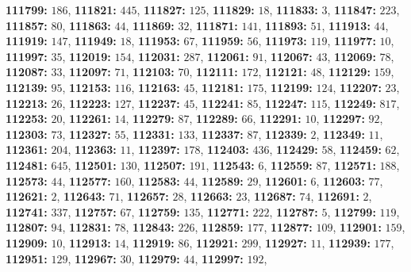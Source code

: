 \textsf{\bfseries 111799:} $186$, \textsf{\bfseries 111821:} $445$, \textsf{\bfseries 111827:} $125$, \textsf{\bfseries 111829:} $18$, \textsf{\bfseries 111833:} $3$, \textsf{\bfseries 111847:} $223$, \textsf{\bfseries 111857:} $80$, \textsf{\bfseries 111863:} $44$, \textsf{\bfseries 111869:} $32$, \textsf{\bfseries 111871:} $141$, \textsf{\bfseries 111893:} $51$, \textsf{\bfseries 111913:} $44$, \textsf{\bfseries 111919:} $147$, \textsf{\bfseries 111949:} $18$, \textsf{\bfseries 111953:} $67$, \textsf{\bfseries 111959:} $56$, \textsf{\bfseries 111973:} $119$, \textsf{\bfseries 111977:} $10$, \textsf{\bfseries 111997:} $35$, \textsf{\bfseries 112019:} $154$, \textsf{\bfseries 112031:} $287$, \textsf{\bfseries 112061:} $91$, \textsf{\bfseries 112067:} $43$, \textsf{\bfseries 112069:} $78$, \textsf{\bfseries 112087:} $33$, \textsf{\bfseries 112097:} $71$, \textsf{\bfseries 112103:} $70$, \textsf{\bfseries 112111:} $172$, \textsf{\bfseries 112121:} $48$, \textsf{\bfseries 112129:} $159$, \textsf{\bfseries 112139:} $95$, \textsf{\bfseries 112153:} $116$, \textsf{\bfseries 112163:} $45$, \textsf{\bfseries 112181:} $175$, \textsf{\bfseries 112199:} $124$, \textsf{\bfseries 112207:} $23$, \textsf{\bfseries 112213:} $26$, \textsf{\bfseries 112223:} $127$, \textsf{\bfseries 112237:} $45$, \textsf{\bfseries 112241:} $85$, \textsf{\bfseries 112247:} $115$, \textsf{\bfseries 112249:} $817$, \textsf{\bfseries 112253:} $20$, \textsf{\bfseries 112261:} $14$, \textsf{\bfseries 112279:} $87$, \textsf{\bfseries 112289:} $66$, \textsf{\bfseries 112291:} $10$, \textsf{\bfseries 112297:} $92$, \textsf{\bfseries 112303:} $73$, \textsf{\bfseries 112327:} $55$, \textsf{\bfseries 112331:} $133$, \textsf{\bfseries 112337:} $87$, \textsf{\bfseries 112339:} $2$, \textsf{\bfseries 112349:} $11$, \textsf{\bfseries 112361:} $204$, \textsf{\bfseries 112363:} $11$, \textsf{\bfseries 112397:} $178$, \textsf{\bfseries 112403:} $436$, \textsf{\bfseries 112429:} $58$, \textsf{\bfseries 112459:} $62$, \textsf{\bfseries 112481:} $645$, \textsf{\bfseries 112501:} $130$, \textsf{\bfseries 112507:} $191$, \textsf{\bfseries 112543:} $6$, \textsf{\bfseries 112559:} $87$, \textsf{\bfseries 112571:} $188$, \textsf{\bfseries 112573:} $44$, \textsf{\bfseries 112577:} $160$, \textsf{\bfseries 112583:} $44$, \textsf{\bfseries 112589:} $29$, \textsf{\bfseries 112601:} $6$, \textsf{\bfseries 112603:} $77$, \textsf{\bfseries 112621:} $2$, \textsf{\bfseries 112643:} $71$, \textsf{\bfseries 112657:} $28$, \textsf{\bfseries 112663:} $23$, \textsf{\bfseries 112687:} $74$, \textsf{\bfseries 112691:} $2$, \textsf{\bfseries 112741:} $337$, \textsf{\bfseries 112757:} $67$, \textsf{\bfseries 112759:} $135$, \textsf{\bfseries 112771:} $222$, \textsf{\bfseries 112787:} $5$, \textsf{\bfseries 112799:} $119$, \textsf{\bfseries 112807:} $94$, \textsf{\bfseries 112831:} $78$, \textsf{\bfseries 112843:} $226$, \textsf{\bfseries 112859:} $177$, \textsf{\bfseries 112877:} $109$, \textsf{\bfseries 112901:} $159$, \textsf{\bfseries 112909:} $10$, \textsf{\bfseries 112913:} $14$, \textsf{\bfseries 112919:} $86$, \textsf{\bfseries 112921:} $299$, \textsf{\bfseries 112927:} $11$, \textsf{\bfseries 112939:} $177$, \textsf{\bfseries 112951:} $129$, \textsf{\bfseries 112967:} $30$, \textsf{\bfseries 112979:} $44$, \textsf{\bfseries 112997:} $192$, 

